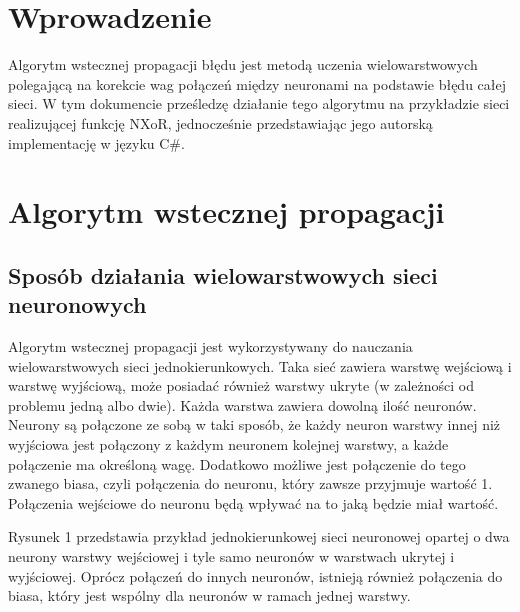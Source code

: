  



\maketitle
\tableofcontents{}
\newpage


\section{Wprowadzenie}
Algorytm wstecznej propagacji błędu jest metodą uczenia wielowarstwowych polegającą na korekcie wag połączeń między neuronami na podstawie błędu całej sieci.
W tym dokumencie prześledzę działanie tego algorytmu na przykładzie sieci realizującej funkcję NXoR,
jednocześnie przedstawiając jego autorską implementację w języku C\#.

\section{Algorytm wstecznej propagacji}
\subsection{Sposób działania wielowarstwowych sieci neuronowych}
Algorytm wstecznej propagacji jest wykorzystywany do nauczania wielowarstwowych sieci jednokierunkowych.
Taka sieć zawiera warstwę wejściową i warstwę wyjściową,
może posiadać również warstwy ukryte (w zależności od problemu jedną albo dwie).
Każda warstwa zawiera dowolną ilość neuronów.
Neurony są połączone ze sobą w taki sposób, że każdy neuron warstwy innej niż wyjściowa jest połączony z każdym neuronem kolejnej warstwy,
a każde połączenie ma określoną wagę.
Dodatkowo możliwe jest połączenie do tego zwanego biasa, czyli połączenia do neuronu, który zawsze przyjmuje wartość 1.
Połączenia wejściowe do neuronu będą wpływać na to jaką będzie miał wartość.

Rysunek 1 przedstawia przykład jednokierunkowej sieci neuronowej opartej o dwa neurony warstwy wejściowej i tyle samo neuronów w warstwach ukrytej i wyjściowej. 
Oprócz połączeń do innych neuronów, istnieją również połączenia do biasa, który jest wspólny dla neuronów w ramach jednej warstwy.

